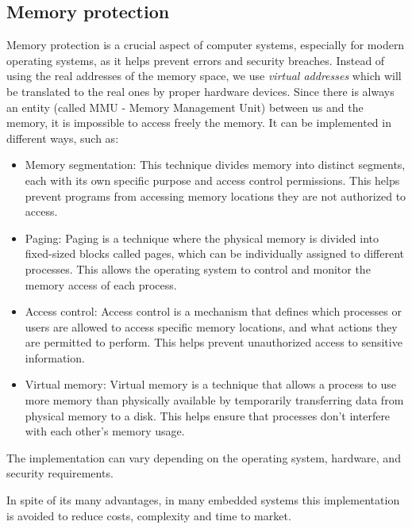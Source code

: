 \subsection{Memory protection}

Memory protection is a crucial aspect of computer systems, especially for modern operating systems, as it helps prevent errors and security breaches. Instead of using the real addresses of the memory space, we use \textit{virtual addresses} which will be translated to the real ones by proper hardware devices. Since there is always an entity (called MMU - Memory Management Unit) between us and the memory, it is impossible to access freely the memory. It can be implemented in different ways, such as:
\begin{itemize}
    \item Memory segmentation: This technique divides memory into distinct segments, each with its own specific purpose and access control permissions. This helps prevent programs from accessing memory locations they are not authorized to access.

    \item Paging: Paging is a technique where the physical memory is divided into fixed-sized blocks called pages, which can be individually assigned to different processes. This allows the operating system to control and monitor the memory access of each process.

    \item Access control: Access control is a mechanism that defines which processes or users are allowed to access specific memory locations, and what actions they are permitted to perform. This helps prevent unauthorized access to sensitive information.

    \item Virtual memory: Virtual memory is a technique that allows a process to use more memory than physically available by temporarily transferring data from physical memory to a disk. This helps ensure that processes don't interfere with each other's memory usage.

\end{itemize}
The implementation can vary depending on the operating system, hardware, and security requirements. 


In spite of its many advantages, in many embedded systems this implementation is avoided to reduce costs, complexity and time to market. 

